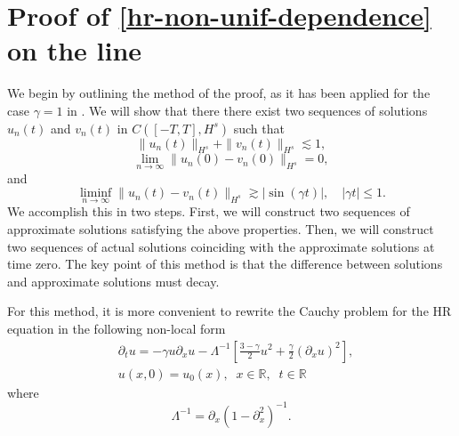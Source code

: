 \documentclass[12pt,reqno]{amsart}
\newcommand{\rr}{\mathbb{R}}
\newcommand{\p}{\partial}
\theoremstyle{plain}  %
\theoremstyle{definition}
\begin{document}
\section{
Proof of  \autoref{hr-non-unif-dependence} on the line
}
\label{sec:2}
%
%
%
%
We begin by outlining the method of the proof,
as it has been applied for the case $\gamma=1$ in \cite{Himonas_2009_Non-uniform-dep}.
We will show  that there there exist two sequences of solutions 
$u_n(t)$
and $v_n(t)$ in $C([-T, T], H^s)$ such that
%
%
%
%
\begin{equation}
\label{h-s-bdd}
\| u_n(t)  \|_{H^s}
+
\| v_n(t)  \|_{H^s}
\lesssim
1,
\end{equation}
%
%
%
%
%
\begin{equation}
\label{zero-limit-at-0}
\lim_{n\to\infty}
\|
u_n(0)
-
v_n(0)
\|_{H^s}
=
0,
\end{equation}
%
%
%
%
and
%
%
%
%
\begin{equation}
\label{bdd-away-from-0}
\liminf_{n\to\infty}
\|
u_n(t)
-
v_n(t)
\|_{H^s}
\gtrsim
|\sin ( \gamma t)|,
\quad
| \gamma t|\le 1.
\end{equation}%
%
%
We accomplish this in two steps.
First, we will construct two sequences of approximate solutions
satisfying the above properties.
Then, we will construct two sequences of actual solutions 
coinciding with the approximate solutions at time zero.
The key point of this method is that 
the difference between solutions and approximate solutions
must decay.

%
%
For this method, it is more convenient 
to rewrite the Cauchy problem for the HR equation 
in the following non-local form
%
%
\begin{align}
& \p_t u =  -\gamma u \p_x u -
\Lambda^{-1} \left[ \frac{3-\gamma}{2}u^2 +
\frac{\gamma}{2} \left( \p_x u \right)^2
\right],
\label{apple1'}
\\
&  u(x,0) = u_0(x), \; \; x \in \rr, \; \; t \in \rr
\label{apple2'}
\end{align}
%
%
where 
\begin{equation*}
	\Lambda^{-1} = \p_x (1 - \p_x^2)^{-1}.
\end{equation*}
%
%
%
%
%
%
\end{document}
